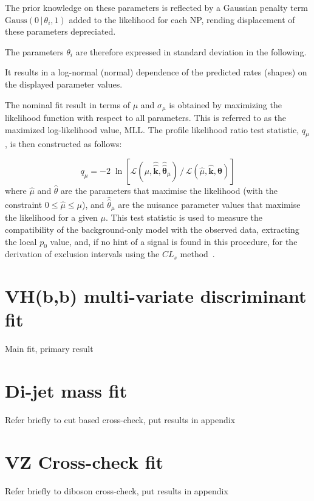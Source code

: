 The prior knowledge on these parameters is reflected by a Gaussian penalty term
$\text{Gauss}(0\,|\,\theta_i,1)$ added to the likelihood for each NP, rending
displacement of these parameters depreciated.

The parameters $\theta_i$ are therefore expressed in standard deviation in the
following.

It results in a log-normal (normal) dependence of the predicted rates (shapes)
on the displayed parameter values.


The nominal fit result in terms of $\mu$ and $\sigma_{\mu}$ is obtained by
maximizing the likelihood function with respect to all parameters.  This is
referred to as the maximized log-likelihood value, MLL. The profile likelihood
ratio test statistic, $q_\mu$, is then constructed as follows:

\begin{equation}
  q_\mu = - 2\; \ln \left[ \mathcal{L} (\mu, \hat{\hat{\mathbf{k}}}, \hat{\hat{\bm\theta}}_{\mu})\, / \, \mathcal{L} (\hat{\mu}, \hat{\mathbf{k}}, \hat{\bm\theta}) \right]
\end{equation}
where $\hat{\mu}$ and $\hat{\theta}$ are the parameters that maximise the
likelihood (with the constraint $0 \leq \hat{\mu} \leq \mu$), and
$\hat{\hat{\theta}}_\mu$ are the nuisance parameter values that maximise the
likelihood for a given $\mu$. This test statistic is used to measure the
compatibility of the background-only model with the observed data, extracting
the local $p_0$ value, and, if no hint of a signal is found in this procedure,
for the derivation of exclusion intervals using the $CL_s$
method~\cite{Cowan:2010js,Read:2002hq}.


\section{VH(b,b) multi-variate discriminant fit}%
\label{sec:mva-fit}
Main fit, primary result

\section{Di-jet mass fit}%
\label{sec:mbb-fit}
Refer briefly to cut based cross-check, put results in appendix
\section{VZ Cross-check fit}%
\label{sec:mvadiboson-fit}
Refer briefly to diboson cross-check, put results in appendix